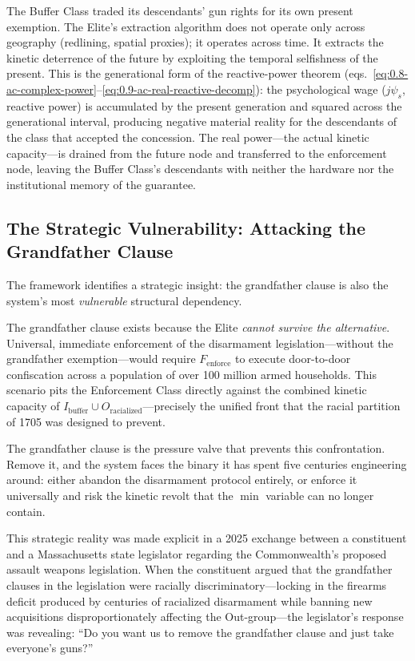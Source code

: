 The Buffer Class traded its descendants' gun rights for its own present exemption. The Elite's extraction algorithm does not operate only across geography (redlining, spatial proxies); it operates across time. It extracts the kinetic deterrence of the future by exploiting the temporal selfishness of the present. This is the generational form of the reactive-power theorem (eqs.~\eqref{eq:0.8-ac-complex-power}--\eqref{eq:0.9-ac-real-reactive-decomp}): the psychological wage ($j\psi_s$, reactive power) is accumulated by the present generation and squared across the generational interval, producing negative material reality for the descendants of the class that accepted the concession. The real power---the actual kinetic capacity---is drained from the future node and transferred to the enforcement node, leaving the Buffer Class's descendants with neither the hardware nor the institutional memory of the guarantee.

\subsection{The Strategic Vulnerability: Attacking the Grandfather Clause}

The framework identifies a strategic insight: the grandfather clause is also the system's most \textit{vulnerable} structural dependency.

The grandfather clause exists because the Elite \textit{cannot survive the alternative}. Universal, immediate enforcement of the disarmament legislation---without the grandfather exemption---would require $F_{\text{enforce}}$ to execute door-to-door confiscation across a population of over 100 million armed households. This scenario pits the Enforcement Class directly against the combined kinetic capacity of $I_{\text{buffer}} \cup O_{\text{racialized}}$---precisely the unified front that the racial partition of 1705 was designed to prevent.

The grandfather clause is the pressure valve that prevents this confrontation. Remove it, and the system faces the binary it has spent five centuries engineering around: either abandon the disarmament protocol entirely, or enforce it universally and risk the kinetic revolt that the $\min$ variable can no longer contain.

This strategic reality was made explicit in a 2025 exchange between a constituent and a Massachusetts state legislator regarding the Commonwealth's proposed assault weapons legislation. When the constituent argued that the grandfather clauses in the legislation were racially discriminatory---locking in the firearms deficit produced by centuries of racialized disarmament while banning new acquisitions disproportionately affecting the Out-group---the legislator's response was revealing: ``Do you want us to remove the grandfather clause and just take everyone's guns?''

